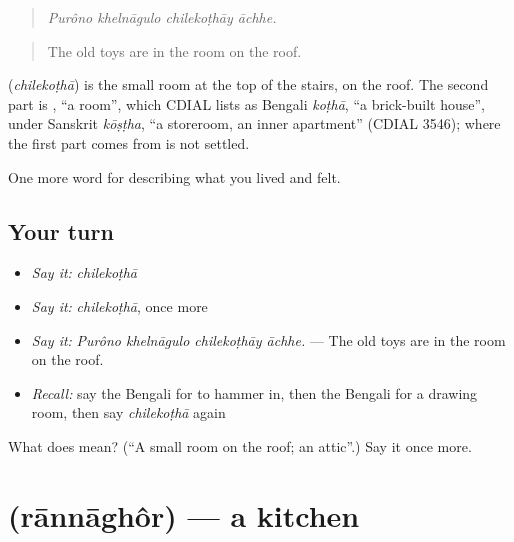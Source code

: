 \begin{quote}
   
\end{quote}

\begin{quote}
\emph{Purôno khelnāgulo chilekoṭhāy āchhe.}
\end{quote}

\begin{quote}
The old toys are in the room on the roof.
\end{quote}

\begin{cousinweb}
\textbf{} (\emph{chilekoṭhā}) is the small room at the top of the stairs, on the roof. The second part is , \textquotedblleft{}a room\textquotedblright{}, which CDIAL lists as Bengali \emph{koṭhā}, \textquotedblleft{}a brick-built house\textquotedblright{}, under Sanskrit \emph{kōṣṭha}, \textquotedblleft{}a storeroom, an inner apartment\textquotedblright{} (CDIAL 3546); where the first part comes from is not settled.
\end{cousinweb}

\begin{grammarlens}[title={What you've built}]
One more word for describing what you lived and felt.
\end{grammarlens}

\subsection*{Your turn}
\begin{itemize}
\raggedright
  \item \emph{Say it:} \emph{chilekoṭhā}
  \item \emph{Say it:} \emph{chilekoṭhā}, once more
  \item \emph{Say it:} \emph{Purôno khelnāgulo chilekoṭhāy āchhe.} — The old toys are in the room on the roof.
  \item \emph{Recall:} say the Bengali for to hammer in, then the Bengali for a drawing room, then say \emph{chilekoṭhā} again
\end{itemize}

\begin{tcolorbox}[breakable,colback=teal!4,colframe=teal!35!black,title={Before you move on}]
What does  mean? (\textquotedblleft{}A small room on the roof; an attic\textquotedblright{}.) Say it once more.
\end{tcolorbox}
\section[\texorpdfstring{\bn{রান্নাঘর} (rānnāghôr)}{রান্নাঘর (rānnāghôr)}]{ (rānnāghôr) — a kitchen}

